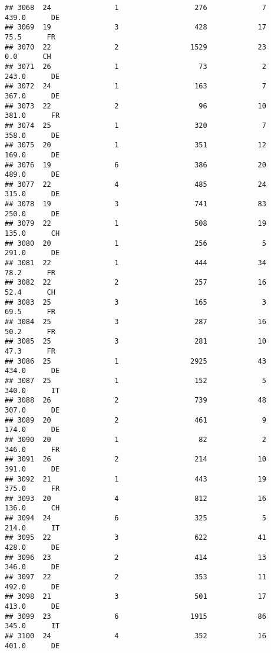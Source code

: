 \documentclass[
]{article}
\begin{document}
\begin{verbatim}
## 3068  24               1                  276             7    439.0      DE
## 3069  19               3                  428            17     75.5      FR
## 3070  22               2                 1529            23      0.0      CH
## 3071  26               1                   73             2    243.0      DE
## 3072  24               1                  163             7    367.0      DE
## 3073  22               2                   96            10    381.0      FR
## 3074  25               1                  320             7    358.0      DE
## 3075  20               1                  351            12    169.0      DE
## 3076  19               6                  386            20    489.0      DE
## 3077  22               4                  485            24    315.0      DE
## 3078  19               3                  741            83    250.0      DE
## 3079  22               1                  508            19    135.0      CH
## 3080  20               1                  256             5    291.0      DE
## 3081  22               1                  444            34     78.2      FR
## 3082  22               2                  257            16     52.4      CH
## 3083  25               3                  165             3     69.5      FR
## 3084  25               3                  287            16     50.2      FR
## 3085  25               3                  281            10     47.3      FR
## 3086  25               1                 2925            43    434.0      DE
## 3087  25               1                  152             5    340.0      IT
## 3088  26               2                  739            48    307.0      DE
## 3089  20               2                  461             9    174.0      DE
## 3090  20               1                   82             2    346.0      FR
## 3091  26               2                  214            10    391.0      DE
## 3092  21               1                  443            19    375.0      FR
## 3093  20               4                  812            16    136.0      CH
## 3094  24               6                  325             5    214.0      IT
## 3095  22               3                  622            41    428.0      DE
## 3096  23               2                  414            13    346.0      DE
## 3097  22               2                  353            11    492.0      DE
## 3098  21               3                  501            17    413.0      DE
## 3099  23               6                 1915            86    345.0      IT
## 3100  24               4                  352            16    401.0      DE

\end{verbatim}
\end{document}
